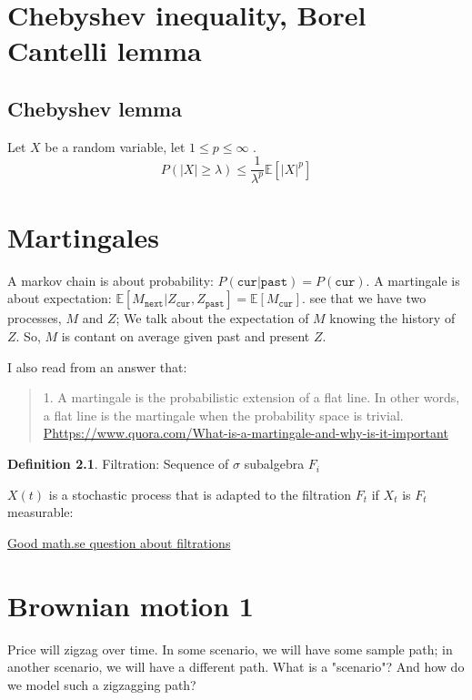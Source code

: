 \documentclass{book}
\newcommand{\E}{\ensuremath{\mathbb{E}}}
\theoremstyle{definition}
\newtheorem{definition}[theorem]{Definition}
\begin{document}
\chapter{Chebyshev inequality, Borel Cantelli lemma}

\section{Chebyshev lemma}


Let $X$ be a random variable, let $1 \leq p \leq \infty$ . 
$$P(|X| \geq \lambda) \leq \frac{1}{\lambda^p}\E[|X|^p]$$


\chapter{Martingales}
A markov chain is about probability: $P(\texttt{cur}|\texttt{past}) = P(\texttt{cur})$. A martingale
is about expectation: $\E[M_\texttt{next}|Z_\texttt{cur}, Z_\texttt{past}] = \E[M_\texttt{cur}]$.
see that we have two processes, $M$ and $Z$; We talk about the expectation of $M$ 
knowing the history of $Z$. So, $M$ is contant on average given past and present $Z$.

I also read from an answer that:

\begin{quote}
1. A martingale is the probabilistic extension of a flat line. In other words, a flat line is the martingale when the probability space is trivial. ~ 
\url{Phttps://www.quora.com/What-is-a-martingale-and-why-is-it-important}
\end{quote}


\begin{definition}
Filtration: Sequence of $\sigma$ subalgebra $F_i$
\end{definition}



$X(t)$ is a stochastic process that is adapted to the filtration $F_t$ if
$X_t$ is $F_t$ measurable:

\href{https://math.stackexchange.com/questions/2279205/example-of-filtration-in-probability-theory}{Good math.se question about filtrations}

\chapter{Brownian motion 1}
Price will zigzag over time. In some scenario, we will have some sample path;
in another scenario, we will have a different path. What is a "scenario"? And
how do we model such a zigzagging path?
\end{document}
